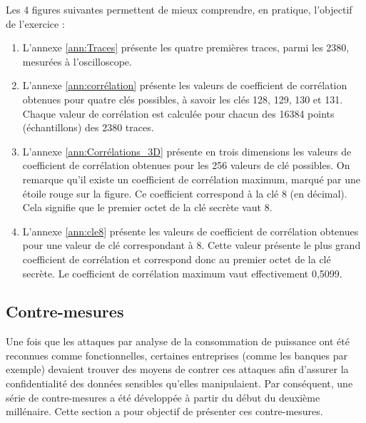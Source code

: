 \documentclass[10pt, oneside, a4paper]{article}
\begin{document}
\hspace{-0.5 cm}Les 4 figures suivantes permettent de mieux comprendre, en pratique, l'objectif de l'exercice :
\begin{enumerate}
\item L'annexe \ref{ann:Traces} présente les quatre premières traces, parmi les 2380, mesurées à l'oscilloscope.
\item L'annexe \ref{ann:corrélation} présente les valeurs de coefficient de corrélation obtenues pour quatre clés possibles, à savoir les clés 128, 129, 130 et 131. Chaque valeur de corrélation est calculée pour chacun des 16384 points (échantillons) des 2380 traces. 
\item L'annexe \ref{ann:Corrélations_3D} présente en trois dimensions les valeurs de coefficient de corrélation obtenues pour les 256 valeurs de clé possibles. On remarque qu'il existe un coefficient de corrélation maximum, marqué par une étoile rouge sur la figure. Ce coefficient correspond à la clé 8 (en décimal). Cela signifie que le premier octet de la clé secrète vaut 8. 
\item L'annexe \ref{ann:cle8} présente les valeurs de coefficient de corrélation obtenues pour une valeur de clé correspondant à 8. Cette valeur présente le plus grand coefficient de corrélation et correspond donc au premier octet de la clé secrète. Le coefficient de corrélation maximum vaut effectivement 0,5099.
\end{enumerate}



\newpage

\subsection{Contre-mesures}
\label{sec:contre-mesures}

\vspace{-0.2 cm}Une fois que les attaques par analyse de la consommation de puissance ont été reconnues comme fonctionnelles, certaines entreprises (comme les banques par exemple) devaient trouver des moyens de contrer ces attaques afin d'assurer la confidentialité des données sensibles qu'elles manipulaient. Par conséquent, une série de contre-mesures a été développée à partir du début du deuxième millénaire. Cette section a pour objectif de présenter ces contre-mesures. 
\end{document}
